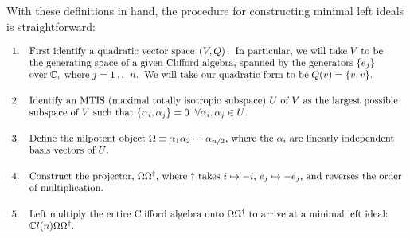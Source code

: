 \documentclass[letterpaper,12pt,titlepage,oneside,final]{book}
\newcommand{\C}{\mathbb{C}}
\begin{document}
With these definitions in hand, the procedure for constructing minimal left ideals is straightforward:

$$\begin{array}{ll}
 1. &  \textup{First identify a quadratic vector space} \hspace{1mm} \left(V,Q\right).\hspace{2mm}  \textup{In particular, we will take}\hspace{1mm} V\hspace{1mm} \textup{to be} 
 
 \\ & \textup{the generating space of a given Clifford algebra, spanned by the generators}\hspace{1mm} \{e_j\}
 \\ &\vspace{.5cm} \textup{over}\hspace{1mm} \C, \hspace{1mm}\textup{where}\hspace{1mm} j=1\dots n.  \hspace{2mm}\textup{We will take our quadratic form to be} \hspace{1mm}Q(v) = \{v,v\}.
\\
  2. & \textup{Identify an MTIS (maximal totally isotropic subspace) $U$ of $V$ as the largest possible }\\
& \vspace{.5cm}  \textup{subspace of $V$ such that $\{\alpha_i,\alpha_j\} = 0 \hspace{2mm}\forall \alpha_i, \alpha_j\in U$.}
\\
  3. &  \textup{Define the nilpotent object $\Omega \equiv \alpha_1 \alpha_2 \cdots \alpha_{n/2}$, where the $\alpha_i$ are linearly independent }
\\  \vspace{.5cm} & \textup{basis vectors of $U$.}
\\
 4. &  \textup{Construct the projector, $\Omega\Omega^{\dagger}$, where $\dagger$ takes $i\mapsto-i$, $e_j\mapsto-e_j$, and reverses the order}
 \\ & \vspace{.5cm}\textup{of multiplication. }\\
  5. &  \textup{Left multiply the entire Clifford algebra onto $\Omega\Omega^{\dagger}$ to arrive at a minimal left ideal:  }
 \\ & \mathbb{C}l(n)\Omega\Omega^{\dagger}. 
\end{array}$$
\medskip
\end{document}
